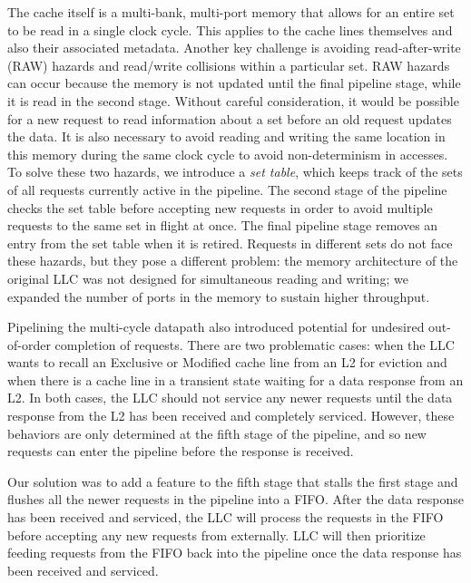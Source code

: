 \par The cache itself is a multi-bank, multi-port memory that allows for an
entire set to be read in a single clock cycle. This applies to the cache lines
themselves and also their associated metadata. Another key challenge is
avoiding read-after-write (RAW) hazards and read/write collisions within a
particular set.  RAW hazards can occur because the memory is not updated until
the final pipeline stage, while it is read in the second stage. Without careful
consideration, it would be possible for a new request to read information about
a set before an old request updates the data. It is also necessary to avoid
reading and writing the same location in this memory during the same clock
cycle to avoid non-determinism in accesses. To solve these two hazards, we introduce
a \emph{set table}, which keeps track of the sets of all requests currently active
in the pipeline. The second stage of the pipeline checks the set table before accepting
new requests in order to avoid multiple requests to the same set in flight at once. The final
pipeline stage removes an entry from the set table when it is retired. Requests
in different sets do not face these hazards, but they pose a different problem:
the memory architecture of the original LLC was not designed for simultaneous
reading and writing; we expanded the number of ports in the memory to sustain
higher throughput.

\par Pipelining the multi-cycle datapath also introduced potential for
undesired out-of-order completion of requests. There are two problematic cases:
when the LLC wants to recall an Exclusive or Modified cache line from an L2 for
eviction and when there is a cache line in a transient state waiting for a data
response from an L2. In both cases, the LLC should not service any newer
requests until the data response from the L2 has been received and completely
serviced. However, these behaviors are only determined at the fifth stage of
the pipeline, and so new requests can enter the pipeline before the response is
received.

Our solution was to add a feature to the fifth stage that stalls the first
stage and flushes all the newer requests in the pipeline into a FIFO. After the
data response has been received and serviced, the LLC will process the requests
in the FIFO before accepting any new requests from externally.
LLC will then prioritize feeding requests from the FIFO back into the pipeline
once the data response has been received and serviced.

